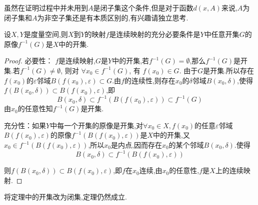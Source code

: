 \documentclass[lang=cn,18pt]{elegantbook}
\begin{document}
\begin{note}
    虽然在证明过程中并未用到$A$是闭子集这个条件,但是对于函数$d(x,A)$来说,$A$为闭子集和$A$为非空子集还是有本质区别的,有兴趣请独立思考.
\end{note}

\begin{theorem}
    设$X,Y$是度量空间,则$X$到$Y$的映射$f$是连续映射的充分必要条件是$Y$中任意开集$G$的原像$f^{-1}(G)$是$X$中的开集.
\end{theorem}
\begin{proof}
    必要性：
$f$是连续映射,$G$是$Y$中的开集,若$f^{-1}(G)=\emptyset$,那么$f^{-1}(G)$是开集.若$f^{-1}(G)\not=\emptyset$, 则对 $\forall x_0 \in f^{-1}(G)$, 有 $f(x_0) \in G$. 由于$G$是开集.所以存在$f(x_0)$的$\varepsilon$邻域$B(f(x_0),\varepsilon) \subset G$.由$f$的连续性,则存在$x_0$的$\delta$邻域$B(x_{0},\delta)$,使得$f(B(x_{0},\delta))\subset B(f(x_{0}),\varepsilon)$,即
$$B(x_{0},\delta)\subset f^{-1}(B(f(x_{0}),\varepsilon)) \subset f^{-1}(G)$$
由$x_0$的任意性知$f^{-1}(G)$是开集.

充分性：如果$Y$中每一个开集的原像是开集,对$\forall x_0 \in X,f(x_0)$的任意$\varepsilon$邻域$B(f(x_0),\varepsilon)$的原像$f^{-1}(B(f(x_{0}),\varepsilon))$是$X$中的开集,又$x_{0}\in f^{-1}(B(f(x_{0}),\varepsilon))$,所以$x_0$是内点,因而存在$x_0$的某个邻域$B(x_0,\delta)$.使得
$$B(x_{0},\delta) \subset f^{-1} (B(f(x_{0}),\varepsilon))$$ 

则$f(B(x_{0},\delta)) \subset B(f(x_{0}),\varepsilon)$,即$f$在$x_0$连续,由$x_0$的任意性,$f$是$X$上的连续映射.
\end{proof}




\begin{note}
    将定理中的开集改为闭集,定理仍然成立.
\end{note}
\end{document}
